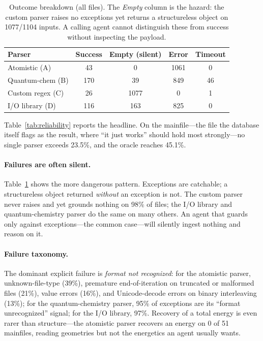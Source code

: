 \documentclass{article}
\begin{document}
\begin{table}[t]
\centering
\small
\begin{tabular}{lcccc}
\toprule
Parser & Success & Empty (silent) & Error & Timeout \\
\midrule
Atomistic (A)    & 43  & 0    & 1061 & 0  \\
Quantum-chem (B) & 170 & 39   & 849  & 46 \\
Custom regex (C) & 26  & 1077 & 0    & 1  \\
I/O library (D)  & 116 & 163  & 825  & 0  \\
\bottomrule
\end{tabular}
\caption{Outcome breakdown (all files). The \emph{Empty} column is the hazard: the
custom parser raises no exceptions yet returns a structureless object on 1077/1104
inputs. A calling agent cannot distinguish these from success without inspecting
the payload.}
\label{tab:outcomes}
\end{table}

Table~\ref{tab:reliability} reports the headline. On the mainfile---the file the
database itself flags as the result, where ``it just works'' should hold most
strongly---no single parser exceeds 23.5\%, and the oracle reaches 45.1\%.

\paragraph{Failures are often silent.} Table~\ref{tab:outcomes} shows the more
dangerous pattern. Exceptions are catchable; a structureless object returned
\emph{without} an exception is not. The custom parser never raises and yet grounds
nothing on 98\% of files; the I/O library and quantum-chemistry parser do the same
on many others. An agent that guards only against exceptions---the common
case---will silently ingest nothing and reason on it.

\paragraph{Failure taxonomy.} The dominant explicit failure is \emph{format not
recognized}: for the atomistic parser, unknown-file-type (39\%), premature
end-of-iteration on truncated or malformed files (21\%), value errors (16\%), and
Unicode-decode errors on binary interleaving (13\%); for the quantum-chemistry
parser, 95\% of exceptions are its ``format unrecognized'' signal; for the I/O
library, 97\%. Recovery of a total energy is even rarer than structure---the
atomistic parser recovers an energy on 0 of 51 mainfiles, reading geometries but
not the energetics an agent usually wants.
\end{document}
